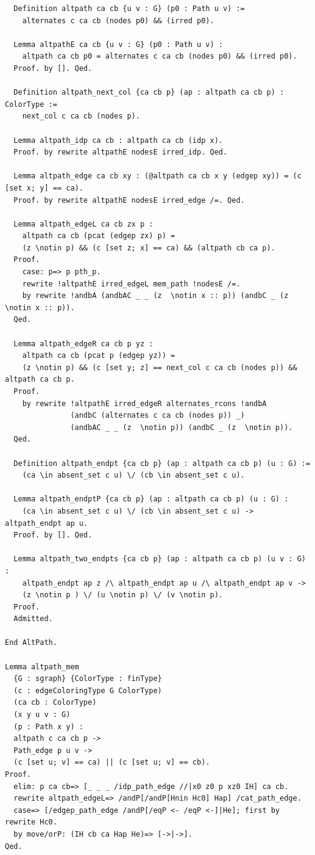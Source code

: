\begin{verbatim}
  Definition altpath ca cb {u v : G} (p0 : Path u v) := 
    alternates c ca cb (nodes p0) && (irred p0).

  Lemma altpathE ca cb {u v : G} (p0 : Path u v) : 
    altpath ca cb p0 = alternates c ca cb (nodes p0) && (irred p0).
  Proof. by []. Qed.

  Definition altpath_next_col {ca cb p} (ap : altpath ca cb p) : ColorType :=
    next_col c ca cb (nodes p).

  Lemma altpath_idp ca cb : altpath ca cb (idp x).
  Proof. by rewrite altpathE nodesE irred_idp. Qed.

  Lemma altpath_edge ca cb xy : (@altpath ca cb x y (edgep xy)) = (c [set x; y] == ca).
  Proof. by rewrite altpathE nodesE irred_edge /=. Qed.

  Lemma altpath_edgeL ca cb zx p : 
    altpath ca cb (pcat (edgep zx) p) = 
    (z \notin p) && (c [set z; x] == ca) && (altpath cb ca p).
  Proof.
    case: p=> p pth_p.
    rewrite !altpathE irred_edgeL mem_path !nodesE /=.
    by rewrite !andbA (andbAC _ _ (z  \notin x :: p)) (andbC _ (z  \notin x :: p)).
  Qed.
  
  Lemma altpath_edgeR ca cb p yz :
    altpath ca cb (pcat p (edgep yz)) = 
    (z \notin p) && (c [set y; z] == next_col c ca cb (nodes p)) && altpath ca cb p.
  Proof.
    by rewrite !altpathE irred_edgeR alternates_rcons !andbA 
               (andbC (alternates c ca cb (nodes p)) _) 
               (andbAC _ _ (z  \notin p)) (andbC _ (z  \notin p)).
  Qed.

  Definition altpath_endpt {ca cb p} (ap : altpath ca cb p) (u : G) :=
    (ca \in absent_set c u) \/ (cb \in absent_set c u). 

  Lemma altpath_endptP {ca cb p} (ap : altpath ca cb p) (u : G) :
    (ca \in absent_set c u) \/ (cb \in absent_set c u) -> altpath_endpt ap u.
  Proof. by []. Qed.

  Lemma altpath_two_endpts {ca cb p} (ap : altpath ca cb p) (u v : G) :
    altpath_endpt ap z /\ altpath_endpt ap u /\ altpath_endpt ap v ->
    (z \notin p ) \/ (u \notin p) \/ (v \notin p).
  Proof.
  Admitted.

End AltPath.
  
Lemma altpath_mem 
  {G : sgraph} {ColorType : finType} 
  (c : edgeColoringType G ColorType) 
  (ca cb : ColorType)
  (x y u v : G)
  (p : Path x y) :
  altpath c ca cb p ->
  Path_edge p u v -> 
  (c [set u; v] == ca) || (c [set u; v] == cb).
Proof.
  elim: p ca cb=> [_ _ _ /idp_path_edge //|x0 z0 p xz0 IH] ca cb.
  rewrite altpath_edgeL=> /andP[/andP[Hnin Hc0] Hap] /cat_path_edge.
  case=> [/edgep_path_edge /andP[/eqP <- /eqP <-]|He]; first by rewrite Hc0.
  by move/orP: (IH cb ca Hap He)=> [->|->].
Qed.
  

\end{verbatim}

